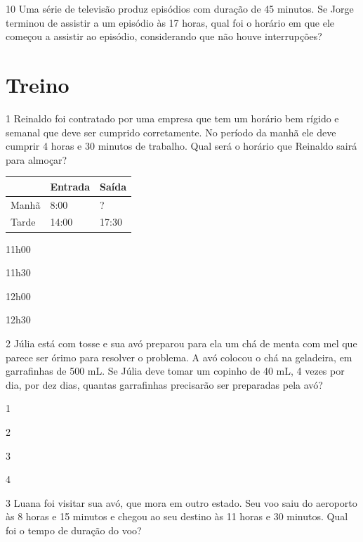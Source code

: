 \num{10} Uma série de televisão produz episódios com duração de 45 minutos.
Se Jorge terminou de assistir a um episódio às 17 horas, qual foi o
horário em que ele começou a assistir ao episódio, considerando que não houve interrupções?

\section*{Treino}

\num{1} Reinaldo foi contratado por uma empresa que tem um horário bem rígido
e semanal que deve ser cumprido corretamente. No período da manhã ele deve
cumprir 4 horas e 30 minutos de trabalho. Qual será o horário que
Reinaldo sairá para almoçar?

\begin{longtable}[]{@{}lll@{}}
\toprule
& Entrada & Saída\tabularnewline
\midrule
\endhead
Manhã & 8:00 & ?\tabularnewline
Tarde & 14:00 & 17:30\tabularnewline
\bottomrule
\end{longtable}

\begin{escolha}
\item
  11h00
\item
  11h30
\item
  12h00
\item
  12h30
\end{escolha}


\num{2} Júlia está com tosse e sua avó preparou para ela um chá de menta com mel que parece ser órimo para resolver o problema. A avó colocou o chá na geladeira, em garrafinhas de 500 mL. Se Júlia deve tomar um copinho de 40 mL, 4 vezes por dia, por dez dias, quantas garrafinhas precisarão ser preparadas pela avó?

\begin{escolha}

\item
  1
\item
  2
\item
  3
\item
  4
\end{escolha}


\num{3} Luana foi visitar sua avó, que mora em outro estado. Seu voo
saiu do aeroporto às 8 horas e 15 minutos e chegou ao seu destino às 11
horas e 30 minutos. Qual foi o tempo de duração do voo?

